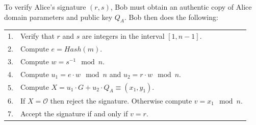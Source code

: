 To verify Alice's signature $(r, s)$, Bob must obtain an authentic copy of Alice domain parameters
and public key $Q_A$. Bob then does the following:\\
\begin{tabular}{l l}
	1. 	&	Verify that $r$ and $s$ are integers in the interval $[1, n-1]$.\\
	2. 	&	Compute $e = Hash(m)$.\\
	3. 	&	Compute $w = s^{-1} \mod n$.\\
	4. 	&	Compute $u_1 = e \cdot w \mod n$ and $u_2 = r \cdot w \mod n$.\\
	5. 	&	Compute $X = u_1 \cdot G + u_2 \cdot Q_A \equiv (x_1, y_1)$.\\
	6. 	&	If $X = \mathcal{O}$ then reject the signature. Otherwise compute $v = x_1 \mod n$.\\
	7. 	&	Accept the signature if and only if $v = r$.\\
\end{tabular}
